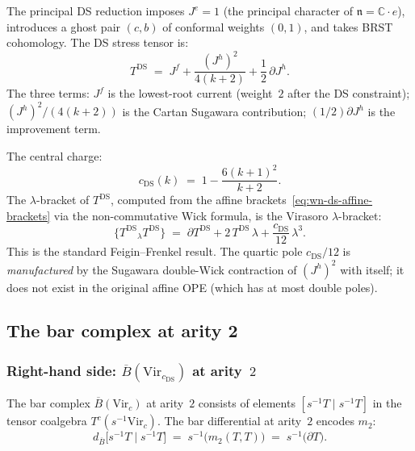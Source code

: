 \documentclass[11pt]{article}
\newcommand{\fn}{\mathfrak{n}}
\newcommand{\barB}{\overline{B}}
\newcommand{\C}{\mathbb{C}}
\begin{document}
The principal DS reduction imposes $J^e = 1$
(the principal character of $\fn = \C\!\cdot\!e$),
introduces a ghost pair $(c, b)$ of conformal weights
$(0, 1)$, and takes BRST cohomology.  The DS stress
tensor is:
\begin{equation}\label{eq:wn-ds-stress-tensor}
T^{\mathrm{DS}}
\;=\;
J^f + \frac{(J^h)^2}{4(k+2)} + \frac{1}{2}\,\partial J^h.
\end{equation}
The three terms: $J^f$ is the lowest-root current
(weight~$2$ after the DS constraint); $(J^h)^2/(4(k+2))$ is
the Cartan Sugawara contribution; $(1/2)\partial J^h$ is the
improvement term.

The central charge:
\begin{equation}\label{eq:wn-ds-cc}
c_{\mathrm{DS}}(k)
\;=\;
1 - \frac{6(k+1)^2}{k+2}.
\end{equation}
The $\lambda$-bracket of $T^{\mathrm{DS}}$, computed from
the affine brackets~\eqref{eq:wn-ds-affine-brackets} via the
non-commutative Wick formula, is the Virasoro
$\lambda$-bracket:
\begin{equation}\label{eq:wn-ds-vir-bracket}
\{T^{\mathrm{DS}}{}_\lambda T^{\mathrm{DS}}\}
\;=\;
\partial T^{\mathrm{DS}} + 2\,T^{\mathrm{DS}}\,\lambda
+ \frac{c_{\mathrm{DS}}}{12}\,\lambda^3.
\end{equation}
This is the standard Feigin--Frenkel result.  The quartic
pole $c_{\mathrm{DS}}/12$ is \emph{manufactured} by the
Sugawara double-Wick contraction of $(J^h)^2$ with itself;
it does not exist in the original affine OPE (which has at
most double poles).

\subsection{The bar complex at arity 2}

\subsubsection*{Right-hand side:
$\barB(\mathrm{Vir}_{c_{\mathrm{DS}}})$ at arity~$2$}

The bar complex $\barB(\mathrm{Vir}_c)$ at arity~$2$
consists of elements $[s^{-1}T \mid s^{-1}T]$ in the
tensor coalgebra $T^c(s^{-1}\mathrm{Vir}_c)$.  The bar
differential at arity~$2$ encodes $m_2$:
\begin{equation}\label{eq:wn-vir-bar-2}
d_{\barB}\bigl[s^{-1}T \mid s^{-1}T\bigr]
\;=\;
s^{-1}\bigl(m_2(T, T)\bigr)
\;=\;
s^{-1}\bigl(\partial T\bigr).
\end{equation}
\end{document}
